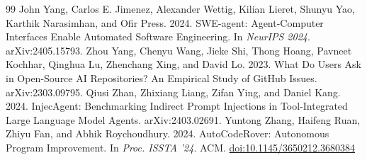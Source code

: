 \documentclass[acmsmall,screen,nonacm]{acmart}
\providecommand{\doi}[1]{\href{https://doi.org/#1}{doi:#1}}
\begin{document}
\begin{thebibliography}{99}
 John Yang, Carlos E. Jimenez, Alexander Wettig, Kilian Lieret, Shunyu Yao, Karthik Narasimhan, and Ofir Press. 2024. SWE-agent: Agent-Computer Interfaces Enable Automated Software Engineering. In \emph{NeurIPS 2024}. arXiv:2405.15793.
 Zhou Yang, Chenyu Wang, Jieke Shi, Thong Hoang, Pavneet Kochhar, Qinghua Lu, Zhenchang Xing, and David Lo. 2023. What Do Users Ask in Open-Source AI Repositories? An Empirical Study of GitHub Issues. arXiv:2303.09795.
 Qiusi Zhan, Zhixiang Liang, Zifan Ying, and Daniel Kang. 2024. InjecAgent: Benchmarking Indirect Prompt Injections in Tool-Integrated Large Language Model Agents. arXiv:2403.02691.
 Yuntong Zhang, Haifeng Ruan, Zhiyu Fan, and Abhik Roychoudhury. 2024. AutoCodeRover: Autonomous Program Improvement. In \emph{Proc. ISSTA '24}. ACM. \doi{10.1145/3650212.3680384}
\end{thebibliography}
\endgroup


\end{document}
